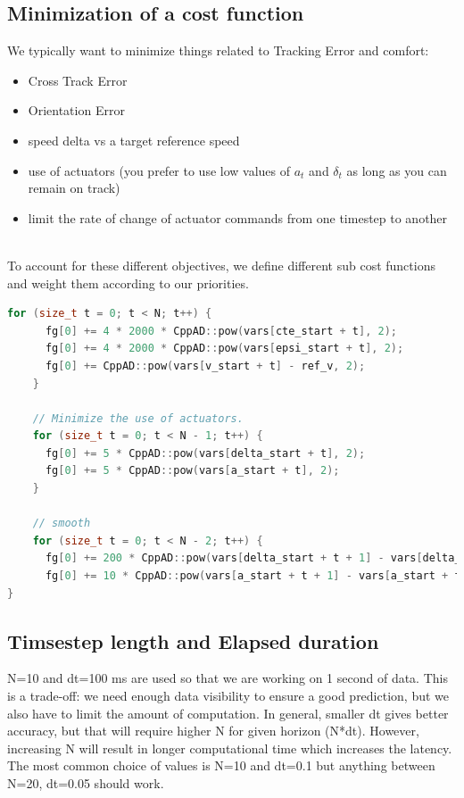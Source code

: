 \documentclass[11pt]{article}
\begin{document}
\subsection{Minimization of a cost function}

We typically want to minimize things related to Tracking Error and comfort:
\begin{itemize}
\item Cross Track Error
\item Orientation Error
\item speed delta vs a target reference speed
\item use of actuators (you prefer to use low values of $a_t$ and $\delta_t$ as long as you can remain on track)
\item limit the rate of change of actuator commands from one timestep to another
\
\end{itemize}

To account for these different objectives, we define different sub cost functions and weight them according to our priorities.

\begin{lstlisting}[language=C++, caption={Cost function example}]
    for (size_t t = 0; t < N; t++) {
      fg[0] += 4 * 2000 * CppAD::pow(vars[cte_start + t], 2);
      fg[0] += 4 * 2000 * CppAD::pow(vars[epsi_start + t], 2);
      fg[0] += CppAD::pow(vars[v_start + t] - ref_v, 2);
    }

    // Minimize the use of actuators.
    for (size_t t = 0; t < N - 1; t++) {
      fg[0] += 5 * CppAD::pow(vars[delta_start + t], 2);
      fg[0] += 5 * CppAD::pow(vars[a_start + t], 2);
    }

    // smooth
    for (size_t t = 0; t < N - 2; t++) {
      fg[0] += 200 * CppAD::pow(vars[delta_start + t + 1] - vars[delta_start + t], 2);
      fg[0] += 10 * CppAD::pow(vars[a_start + t + 1] - vars[a_start + t], 2);
}
\end{lstlisting}


\subsection{Timsestep length and Elapsed duration}

N=10 and dt=100 ms are used so that we are working on 1 second of data.
This is a trade-off: we need enough data visibility to ensure a good prediction, but we also have to limit the amount of computation.
In general, smaller dt gives better accuracy, but that will require higher N for given horizon (N*dt). However, increasing N will result in longer computational time which increases the latency. The most common choice of values is N=10 and dt=0.1 but anything between N=20, dt=0.05 should work.
\end{document}
